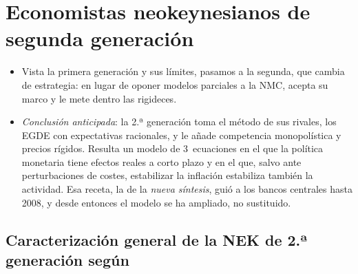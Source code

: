 \documentclass[11pt]{article}
\begin{document}
\section{Economistas neokeynesianos de segunda generación}\label{sec:segunda}

\begin{itemize}
\item Vista la primera generación y sus límites, pasamos a la segunda, que cambia de estrategia: en lugar de oponer modelos parciales a la NMC, acepta su marco y le mete dentro las rigideces.
\item \emph{Conclusión anticipada}: la 2.ª generación toma el método de sus rivales, los EGDE con expectativas racionales, y le añade competencia monopolística y precios rígidos. Resulta un modelo de 3~ecuaciones en el que la política monetaria tiene efectos reales a corto plazo y en el que, salvo ante perturbaciones de costes, estabilizar la inflación estabiliza también la actividad. Esa receta, la de la \emph{nueva síntesis}, guió a los bancos centrales hasta 2008, y desde entonces el modelo se ha ampliado, no sustituido.
\end{itemize}

\subsection{Caracterización general de la NEK de 2.ª generación según }\label{sec:caracterizacion-segunda}
\end{document}
